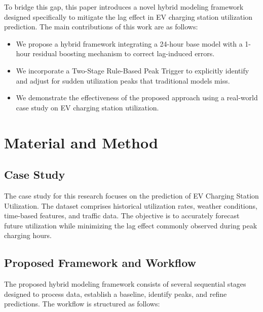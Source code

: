 \documentclass[journal]{IEEEtran}
\begin{document}
To bridge this gap, this paper introduces a novel hybrid modeling framework designed specifically to mitigate the lag effect in EV charging station utilization prediction. The main contributions of this work are as follows:
\begin{itemize}
    \item We propose a hybrid framework integrating a 24-hour base model with a 1-hour residual boosting mechanism to correct lag-induced errors.
    \item We incorporate a Two-Stage Rule-Based Peak Trigger to explicitly identify and adjust for sudden utilization peaks that traditional models miss.
    \item We demonstrate the effectiveness of the proposed approach using a real-world case study on EV charging station utilization.
\end{itemize}

\section{Material and Method}

\subsection{Case Study}
The case study for this research focuses on the prediction of EV Charging Station Utilization. The dataset comprises historical utilization rates, weather conditions, time-based features, and traffic data. The objective is to accurately forecast future utilization while minimizing the lag effect commonly observed during peak charging hours.

\subsection{Proposed Framework and Workflow}
The proposed hybrid modeling framework consists of several sequential stages designed to process data, establish a baseline, identify peaks, and refine predictions. The workflow is structured as follows:
\end{document}

